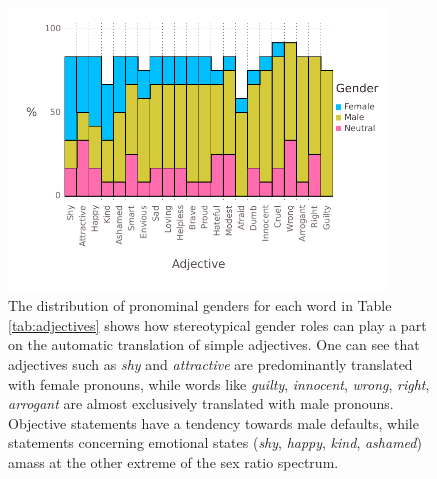 \documentclass[fleqn,10pt]{article}
\begin{document}
\begin{figure}[H]
	\centering
	\includegraphics[width=10cm]{pictures/barplot-adjectives}
	\caption{The distribution of pronominal genders for each word in Table \ref{tab:adjectives} shows how stereotypical gender roles can play a part on the automatic translation of simple adjectives. One can see that adjectives such as \emph{shy} and \emph{attractive} are predominantly translated with female pronouns, while words like \emph{guilty}, \emph{innocent}, \emph{wrong}, \emph{right}, \emph{arrogant} are almost exclusively translated with male pronouns. Objective statements have a tendency towards male defaults, while statements concerning emotional states (\emph{shy}, \emph{happy}, \emph{kind}, \emph{ashamed}) amass at the other extreme of the sex ratio spectrum.}
	\label{fig:barplot-adjectives}
\end{figure}

\fi
\end{document}
